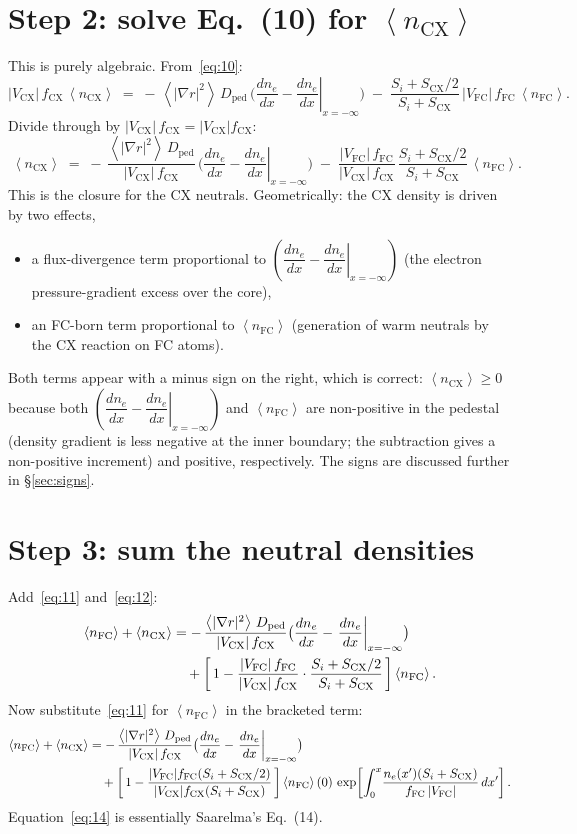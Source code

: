 \documentclass[11pt]{article}
\renewcommand{\ne}{n_{e}}  %
\newcommand{\nfc}{n_{\mathrm{FC}}}
\newcommand{\ncx}{n_{\mathrm{CX}}}
\newcommand{\Vfc}{\lvert V_{\mathrm{FC}}\rvert}
\newcommand{\Vcx}{\lvert V_{\mathrm{CX}}\rvert}
\newcommand{\Si}{S_{i}}
\newcommand{\Scx}{S_{\mathrm{CX}}}
\newcommand{\Dped}{D_{\mathrm{ped}}}
\newcommand{\fFC}{f_{\mathrm{FC}}}
\newcommand{\fCX}{f_{\mathrm{CX}}}
\newcommand{\fsa}[1]{\left\langle #1 \right\rangle}
\newcommand{\gradrsq}{\fsa{|\nabla r|^{2}}}
\newcommand{\neginf}{x=-\infty}
\newcommand{\dneneg}{\left.\dfrac{d\ne}{dx}\right|_{\neginf}}
\newcommand{\dnexnow}{\dfrac{d\ne}{dx}}
\newcommand{\nFCzero}{\fsa{\nfc}(0)}
\newcommand{\Afactor}{\Vfc\,\fFC}
\newcommand{\Bfactor}{\Vcx\,\fCX}
\begin{document}
\section{Step 2: solve Eq.~(10) for $\fsa{\ncx}$}
\label{sec:solve-ncx}

This is purely algebraic.  From~\eqref{eq:10}:
\begin{equation}
  \Bfactor\,\fsa{\ncx} \;=\; -\,\gradrsq\,\Dped\,\bigl(\dnexnow - \dneneg\bigr)
     \;-\; \frac{\Si+\Scx/2}{\Si+\Scx}\,\Afactor\,\fsa{\nfc}.
\end{equation}
Divide through by $\Bfactor=\Vcx\fCX$:
\begin{equation}
  \boxed{\;
    \fsa{\ncx} \;=\;
      -\,\frac{\gradrsq\,\Dped}{\Bfactor}\,\bigl(\dnexnow - \dneneg\bigr)
      \;-\; \frac{\Afactor}{\Bfactor}\,\frac{\Si+\Scx/2}{\Si+\Scx}\,\fsa{\nfc}.
  \;}
  \label{eq:12}
\end{equation}
This is the closure for the CX neutrals.  Geometrically: the CX density
is driven by two effects,
\begin{itemize}
  \item a flux-divergence term proportional to $(\dnexnow-\dneneg)$
        (the electron pressure-gradient excess over the core),
  \item an FC-born term proportional to $\fsa{\nfc}$ (generation of warm
        neutrals by the CX reaction on FC atoms).
\end{itemize}
Both terms appear with a minus sign on the right, which is correct:
$\fsa{\ncx}\ge 0$ because both $(\dnexnow-\dneneg)$ and $\fsa{\nfc}$ are
non-positive in the pedestal (density gradient is less negative at the
inner boundary; the subtraction gives a non-positive increment) and
positive, respectively.  The signs are discussed further in §\ref{sec:signs}.

\section{Step 3: sum the neutral densities}
\label{sec:sum}

Add~\eqref{eq:11} and~\eqref{eq:12}:
\begin{align}
  \fsa{\nfc} + \fsa{\ncx}
    &= -\,\frac{\gradrsq\,\Dped}{\Bfactor}\bigl(\dnexnow-\dneneg\bigr) \notag\\
    &\quad + \left[\,1 - \frac{\Afactor}{\Bfactor}\cdot\frac{\Si+\Scx/2}{\Si+\Scx}\,\right]\fsa{\nfc}.
  \label{eq:13}
\end{align}
Now substitute~\eqref{eq:11} for $\fsa{\nfc}$ in the bracketed term:
\begin{align}
  \fsa{\nfc} + \fsa{\ncx}
    &= -\,\frac{\gradrsq\,\Dped}{\Bfactor}\bigl(\dnexnow-\dneneg\bigr) \notag\\
    &\quad + \left[\,1 - \frac{\Vfc\fFC(\Si+\Scx/2)}{\Vcx\fCX(\Si+\Scx)}\,\right]
             \nFCzero\,\exp\!\left[\int_{0}^{x}\!\frac{\ne(x')(\Si+\Scx)}{\fFC\,\Vfc}\,dx'\right].
  \label{eq:14}
\end{align}
Equation~\eqref{eq:14} is essentially Saarelma's Eq.~(14).
\end{document}
